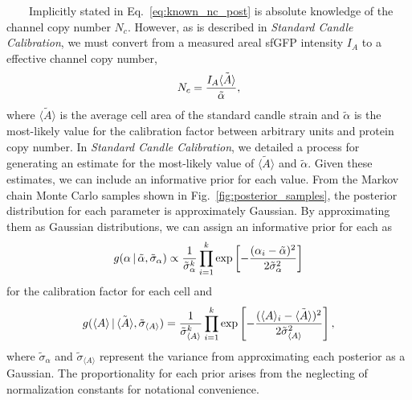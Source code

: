 ~~~~Implicitly
stated
in
Eq.~\ref{eq:known_nc_post}
is
absolute
knowledge
of the
channel
copy
number
\(N_c\).
However,
as is
described
in
\emph{Standard
Candle
Calibration},
we
must
convert
from a
measured
areal
sfGFP
intensity
\(I_A\)
to a
effective
channel
copy
number,
\begin{equation}
N_c = {I_A \tilde{\langle A \rangle} \over \tilde{\alpha}},
\label{eq:standard_candle}\end{equation}
where
\(\tilde{\langle A \rangle}\)
is the
average
cell
area
of the
standard
candle
strain
and
\(\tilde{\alpha}\)
is the
most-likely
value
for
the
calibration
factor
between
arbitrary
units
and
protein
copy
number.
In
\emph{Standard
Candle
Calibration},
we
detailed
a
process
for
generating
an
estimate
for
the
most-likely
value
of
\(\tilde{\langle A \rangle}\)
and
\(\tilde{\alpha}\).
Given
these
estimates,
we can
include
an
informative
prior
for
each
value.
From
the
Markov
chain
Monte
Carlo
samples
shown
in
Fig.~\ref{fig:posterior_samples},
the
posterior
distribution
for
each
parameter
is
approximately
Gaussian.
By
approximating
them
as
Gaussian
distributions,
we can
assign
an
informative
prior
for
each
as
\begin{equation}
g(\alpha\,\vert\,\tilde{\alpha}, \tilde{\sigma}_\alpha) \propto {1 \over \tilde{\sigma}_\alpha^k}\prod\limits_{i=1}^k\exp\left[-{(\alpha_i - \tilde{\alpha})^2 \over  2\tilde{\sigma}_\alpha^2}\right]
\label{eq:alpha_prior}\end{equation}
for
the
calibration
factor
for
each
cell
and
\begin{equation}
g(\langle A \rangle\,\vert\,\tilde{\langle A \rangle},\tilde{\sigma}_{\langle A \rangle}) = {1 \over \tilde{\sigma}_{\langle A \rangle}^k}\prod\limits_{i=1}^k\exp\left[-{(\langle A \rangle_i - \tilde{\langle A \rangle})^2 \over 2\tilde{\sigma}_{\langle A \rangle}^2}\right],
\label{eq:area_prior}\end{equation}
where
\(\tilde{\sigma}_\alpha\)
and
\(\tilde{\sigma}_{\langle A \rangle}\)
represent
the
variance
from
approximating
each
posterior
as a
Gaussian.
The
proportionality
for
each
prior
arises
from
the
neglecting
of
normalization
constants
for
notational
convenience.

